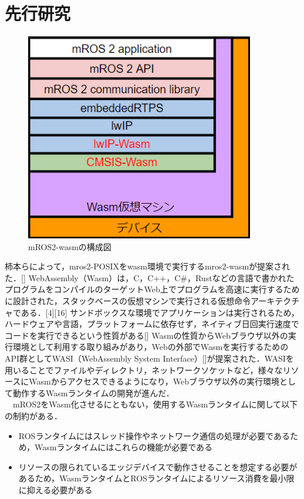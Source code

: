 \chapter{先行研究}
\begin{figure}[ht]
    \centering
    \includegraphics[width=10cm]{images/fig3_mros2-wasm_configuration.png}
    \caption{mROS2-wasmの構成図}
    \label{fig:mros2-wasm_configuration}
\end{figure}
柿本らによって，mros2-POSIXをwasm環境で実行するmros2-wasmが提案された．[]
WebAssembly（Wasm）は，C，C++，C\#，Rustなどの言語で書かれたプログラムをコンパイルのターゲットWeb上でプログラムを高速に実行するために設計された，スタックベースの仮想マシンで実行される仮想命令アーキテクチャである．[4][16]
サンドボックスな環境でアプリケーションは実行されるため，ハードウェアや言語，プラットフォームに依存せず，ネイティブ日回実行速度でコードを実行できるという性質がある[]
Wasmの性質からWebブラウザ以外の実行環境として利用する取り組みがあり，Webの外部でWasmを実行するためのAPI群としてWASI（WebAssembly System Interface）[]が提案された．WASIを用いることでファイルやディレクトリ，ネットワークソケットなど，様々なリソースにWasmからアクセスできるようになり，Webブラウザ以外の実行環境として動作するWasmランタイムの開発が進んだ．
\\　mROS2をWasm化させるにともない，使用するWasmランタイムに関して以下の制約がある．
\begin{itemize}
    \item ROSランタイムにはスレッド操作やネットワーク通信の処理が必要であるため，Wasmランタイムにはこれらの機能が必要である
    \item リソースの限られているエッジデバイスで動作させることを想定する必要があるため，WasmランタイムとROSランタイムによるリソース消費を最小限に抑える必要がある
\end{itemize}
